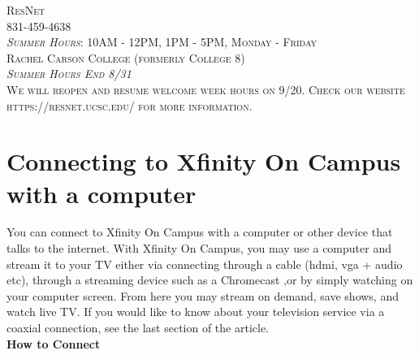 \documentclass[a4paper, 11pt]{article}
\begin{document}
\begin{titlepage}
	{\scshape ResNet \\ 831-459-4638 \\
          \textit{Summer Hours}: 10AM - 12PM, 1PM - 5PM, Monday - Friday \\
          Rachel Carson College (formerly College 8) \\
          \vfill
          \vfill
          \vfill
          \textit{Summer Hours End 8/31}\\ 
          We will reopen and resume welcome week hours on 9/20.  Check our
          website https://resnet.ucsc.edu/ for more information. 
  } %
	
	\vfill %
	

\end{titlepage}




\section*{
  Connecting to Xfinity On Campus with a computer
}

You can connect to Xfinity On Campus with a computer or other device that
talks to the internet. With Xfinity On Campus, you may
use a computer and stream it to your TV either via connecting through a 
cable (hdmi, vga + audio etc), through a streaming device such as a Chromecast
,or by simply watching on your computer screen.
From here you may stream on demand, save shows, and 
watch live TV. If you would like to know about your television service 
via a coaxial connection, see the last section of the article.\\
{\newline}
\textbf{How to Connect}
\end{document}
